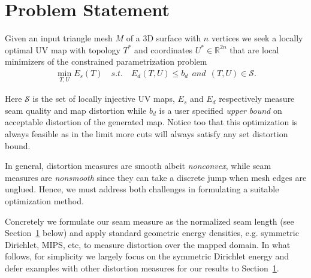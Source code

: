 
\section{Problem Statement}

Given an input triangle mesh $M$ of a 3D surface with $n$ vertices we seek a locally optimal UV map with topology $T^*$ and coordinates $U^* \in \mathbb{R}^{2n}$ that are local minimizers of the constrained parametrization problem
\begin{align}
	\min_{T,U} E_s(T) \quad s.t. \quad E_d(T,U) \leq b_d\ \ and\ \ (T, U) \in \mathcal{S}.
	\label{eq:p1}
\end{align}
 

Here $\mathcal{S}$ is the set of locally injective UV maps, $E_s$ and $E_d$ respectively measure seam quality and map distortion while $b_d$ is a user specified \emph{upper bound} on acceptable distortion of the generated map. Notice too that this optimization is always feasible as in the limit more cuts will always satisfy any set distortion bound. %

In general, distortion measures are smooth albeit \emph{nonconvex}, while seam measures are \emph{nonsmooth} since they can take a discrete jump when mesh edges are unglued.  Hence, we must address both challenges in formulating a suitable %
optimization method. 

Concretely we formulate our seam measure as the normalized seam length (see Section\ \ref{} below) and apply standard geometric energy densities, e.g. symmetric Dirichlet, MIPS, etc, to measure distortion over the mapped domain. In what follows, for simplicity we largely focus on the symmetric Dirichlet energy and defer examples with other distortion measures for our results to Section\ \ref{}.


